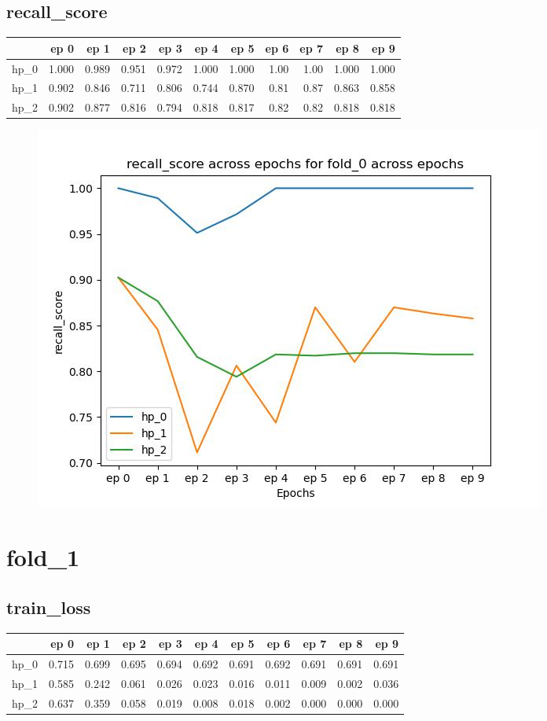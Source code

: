 \documentclass{article}
\begin{document}
\subsection{recall\_score}
\begin{tabular}{lrrrrrrrrrr}
\toprule
{} &   ep 0 &   ep 1 &   ep 2 &   ep 3 &   ep 4 &   ep 5 &  ep 6 &  ep 7 &   ep 8 &   ep 9 \\
\midrule
hp\_0 &  1.000 &  0.989 &  0.951 &  0.972 &  1.000 &  1.000 &  1.00 &  1.00 &  1.000 &  1.000 \\
hp\_1 &  0.902 &  0.846 &  0.711 &  0.806 &  0.744 &  0.870 &  0.81 &  0.87 &  0.863 &  0.858 \\
hp\_2 &  0.902 &  0.877 &  0.816 &  0.794 &  0.818 &  0.817 &  0.82 &  0.82 &  0.818 &  0.818 \\
\bottomrule
\end{tabular}

\begin{figure}[H]
\includegraphics[scale = 0.75]{fold_0/recall_score}
\end{figure}
\section{fold\_1}
\subsection{train\_loss}
\begin{tabular}{lrrrrrrrrrr}
\toprule
{} &   ep 0 &   ep 1 &   ep 2 &   ep 3 &   ep 4 &   ep 5 &   ep 6 &   ep 7 &   ep 8 &   ep 9 \\
\midrule
hp\_0 &  0.715 &  0.699 &  0.695 &  0.694 &  0.692 &  0.691 &  0.692 &  0.691 &  0.691 &  0.691 \\
hp\_1 &  0.585 &  0.242 &  0.061 &  0.026 &  0.023 &  0.016 &  0.011 &  0.009 &  0.002 &  0.036 \\
hp\_2 &  0.637 &  0.359 &  0.058 &  0.019 &  0.008 &  0.018 &  0.002 &  0.000 &  0.000 &  0.000 \\
\bottomrule
\end{tabular}
\end{document}
